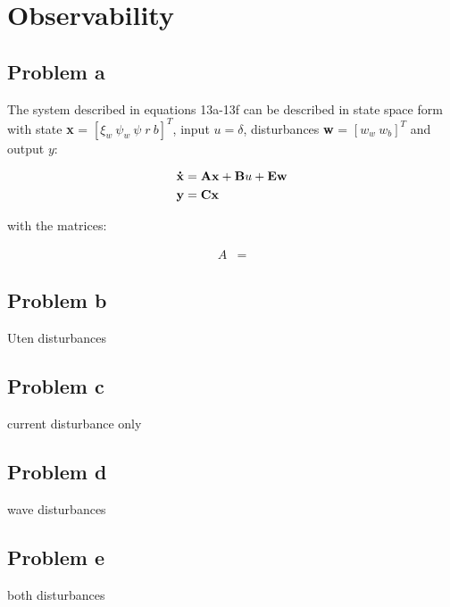 \section{Observability}
\subsection{Problem a}
The system described in equations 13a-13f \cite{assignment} can be described in state space form 
with state \textbf{x} = $[\xi_w\: \psi_w\: \psi\; r\: b]^T$, input $u = \delta$, 
disturbances \textbf{w} = $[w_w\: w_b]^T$ and output $y$:

\begin{align*}
    \bf{\dot{x}} &= \textbf{Ax} + \textbf{B}u + \textbf{Ew} \\
    \textbf{y} &= \textbf{Cx}
\end{align*}

with the matrices:

\begin{align*}
    A &= 
\end{align*}

\subsection{Problem b}
Uten disturbances
\subsection{Problem c}
current disturbance only
\subsection{Problem d}
wave disturbances
\subsection{Problem e}
both disturbances